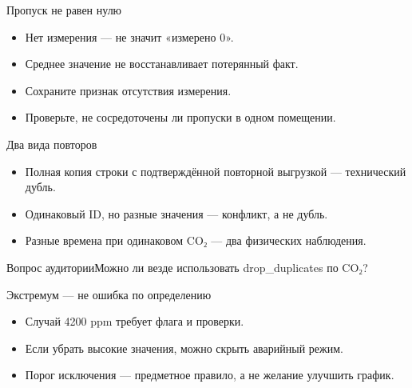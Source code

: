 \documentclass[aspectratio=169,10pt]{beamer}
\begin{document}
\begin{frame}[t]{Пропуск не равен нулю}
\begin{itemize}
\item Нет измерения — не значит «измерено 0».
\vspace{4pt}
\item Среднее значение не восстанавливает потерянный факт.
\vspace{4pt}
\item Сохраните признак отсутствия измерения.
\vspace{4pt}
\item Проверьте, не сосредоточены ли пропуски в одном помещении.
\vspace{4pt}
\end{itemize}
\end{frame}
\begin{frame}[t]{Два вида повторов}
\begin{itemize}
\item Полная копия строки с подтверждённой повторной выгрузкой — технический дубль.
\vspace{4pt}
\item Одинаковый ID, но разные значения — конфликт, а не дубль.
\vspace{4pt}
\item Разные времена при одинаковом CO₂ — два физических наблюдения.
\vspace{4pt}
\end{itemize}
\vfill\begin{alertblock}{Вопрос аудитории}Можно ли везде использовать drop\_duplicates по CO₂?\end{alertblock}
\end{frame}
\begin{frame}[t]{Экстремум — не ошибка по определению}
\begin{itemize}
\item Случай 4200 ppm требует флага и проверки.
\vspace{4pt}
\item Если убрать высокие значения, можно скрыть аварийный режим.
\vspace{4pt}
\item Порог исключения — предметное правило, а не желание улучшить график.
\vspace{4pt}
\end{itemize}
\end{frame}
\end{document}
